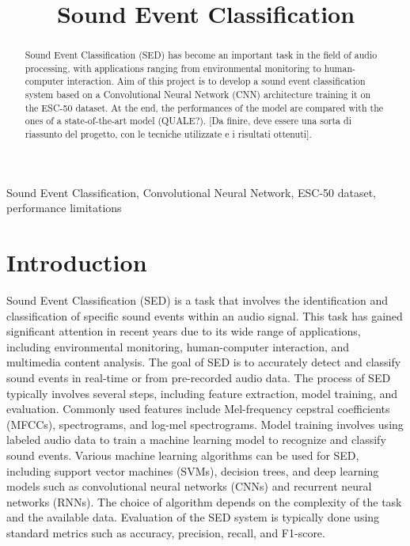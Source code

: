 \documentclass{article}
\title{Sound Event Classification}
\begin{document}
\ninept
\maketitle

\begin{sloppy}

\begin{abstract}
  Sound Event Classification (SED) has become an important task in the field of
  audio processing, with applications ranging from environmental monitoring to
  human-computer interaction. Aim of this project is to develop a sound event classification system
  based on a Convolutional Neural Network (CNN) architecture training it on the ESC-50 dataset.
  At the end, the performances of the model are compared with the ones of a state-of-the-art model (QUALE?).
  [Da finire, deve essere una sorta di riassunto del progetto, con le tecniche utilizzate e i risultati ottenuti].
\end{abstract}

\begin{keywords}
Sound Event Classification, Convolutional Neural Network, ESC-50 dataset, performance limitations
\end{keywords}

\section{Introduction}
\label{sec:intro}
Sound Event Classification (SED) is a task that involves the identification and classification of
specific sound events within an audio signal. This task has gained significant attention in recent years
due to its wide range of applications, including environmental monitoring\cite{birdsCNN2017}, human-computer interaction\cite{emotionRecognition2021}, and multimedia content analysis\cite{kumar2016weaklysupervisedscalableaudio}.
The goal of SED is to accurately detect and classify sound events in real-time or from pre-recorded audio data.
The process of SED typically involves several steps, including feature extraction, model training, and evaluation\cite{ReviewSoundEvent2025}.
Commonly used features include Mel-frequency cepstral coefficients (MFCCs), spectrograms, and log-mel spectrograms.
Model training involves using labeled audio data to train a machine learning model to recognize and classify sound events.
Various machine learning algorithms can be used for SED, including support vector machines (SVMs), decision trees, and deep
learning models such as convolutional neural networks (CNNs) and recurrent neural networks (RNNs)\cite{DescriptiveESC2022}.
The choice of algorithm depends on the complexity of the task and the available data.
Evaluation of the SED system is typically done using standard metrics such as accuracy, precision, recall, and F1-score.


\end{sloppy}
\end{document}
